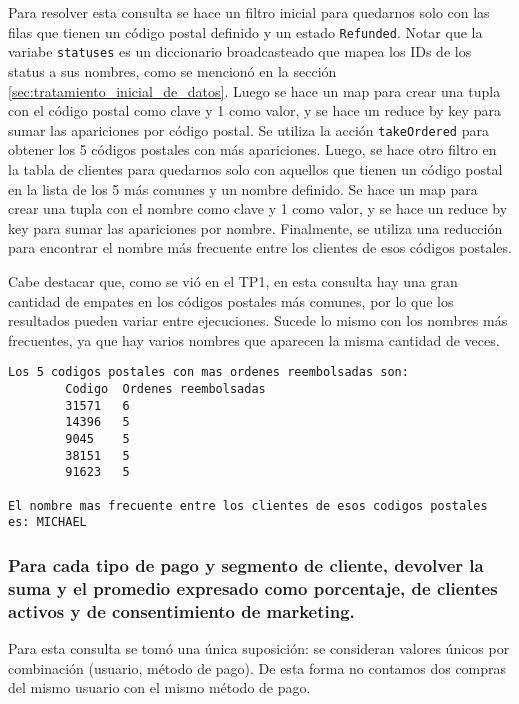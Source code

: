 Para resolver esta consulta se hace un filtro inicial para quedarnos solo con las filas que tienen un código postal definido y un estado \texttt{Refunded}. Notar que la variabe \texttt{statuses} es un diccionario broadcasteado que mapea los IDs de los status a sus nombres, como se mencionó en la sección \ref{sec:tratamiento_inicial_de_datos}. Luego se hace un map para crear una tupla con el código postal como clave y 1 como valor, y se hace un reduce by key para sumar las apariciones por código postal. Se utiliza la acción \texttt{takeOrdered} para obtener los 5 códigos postales con más apariciones. Luego, se hace otro filtro en la tabla de clientes para quedarnos solo con aquellos que tienen un código postal en la lista de los 5 más comunes y un nombre definido. Se hace un map para crear una tupla con el nombre como clave y 1 como valor, y se hace un reduce by key para sumar las apariciones por nombre. Finalmente, se utiliza una reducción para encontrar el nombre más frecuente entre los clientes de esos códigos postales.

Cabe destacar que, como se vió en el TP1, en esta consulta hay una gran cantidad de empates en los códigos postales más comunes, por lo que los resultados pueden variar entre ejecuciones. Sucede lo mismo con los nombres más frecuentes, ya que hay varios nombres que aparecen la misma cantidad de veces.

\begin{lstlisting}[style=console, caption=Resultados de la consulta 2 propuesta por el enunciado, label={lst:enunciado_q2_results}, xleftmargin=30pt, xrightmargin=30pt]
Los 5 codigos postales con mas ordenes reembolsadas son:
        Codigo	Ordenes reembolsadas
        31571	6
        14396	5
        9045	5
        38151	5
        91623	5

El nombre mas frecuente entre los clientes de esos codigos postales es: MICHAEL
\end{lstlisting}

\subsubsection{Para cada tipo de pago y segmento de cliente, devolver la suma y el promedio expresado como porcentaje, de clientes activos y de consentimiento de marketing.}
Para esta consulta se tomó una única suposición: se consideran valores únicos por combinación (usuario, método de pago). De esta forma no contamos dos compras del mismo usuario con el mismo método de pago.

